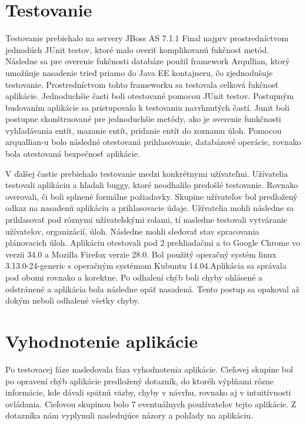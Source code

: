 	



 
\section{Testovanie}
Testovanie prebiehalo na servery JBoss AS 7.1.1 Final najprv prostredníctvom jednodúch JUnit testov, ktoré malo overiť komplikovanú fukčnosť metód. Následne sa pre overenie fukčnosti databáze použil framework Arqullian, ktorý umožňuje nasadenie tried priamo do Java EE kontajneru, čo zjednodušuje testovanie. Prostredníctvom tohto frameworku sa testovala celková fukčnosť aplikácie. Jednoduchšie časti boli otestované pomocou JUnit testov. Postupným budovaním aplikácie sa pristupovalo k testovaniu navrhnutých častí. Junit boli postupne skonštruované pre jednoduchšie metódy, ako je overenie funkčnosti vyhľadávania entít, mazanie entít, pridanie entít do zoznamu úloh. Pomocou arquallian-u bolo následné otestovaná prihlasovanie, databázové operácie, rovnako bola otestovaná bezpečnosť aplikácie.


V ďalšej častie prebiehalo testovanie medzi konkrétnymi užívateľmi. Užívatelia testovali aplikáciu a hľadali buggy, ktoré neodhalilo predošlé testovanie. Rovnako overovali, či boli splnené formálne požiadavky. Skupine užívateľov bol predložený odkaz na nasadenú aplikáciu a prihlasovacie údaje. Užívatelia mohli následne sa prihlasovať pod rôznymi užívateľskými rolami, tí nasledne testovali vytváranie užívatelov, organizácií, úloh. Následne mohli sledovať stav spracovania plánovacich úloh. Aplikáciu otestovali pod 2 prehliadačmi a to Google Chrome vo verzii 34.0 a Mozilla Firefox verzie 28.0. Bol použitý operačný systém linux 3.13.0-24-generic s operačným systémom Kubuntu 14.04.Aplikácia sa správala pod obomi rovnako a korektne. Po odhalení chýb boli chyby ohlásené a odstránené a aplikácia bola následne opäť nasadená. Tento postup sa opakoval až dokým neboli odhalené všetky chyby. 




\section{Vyhodnotenie aplikácie}
Po testovacej fáze nasledovala fáza vyhodnotenia aplikácie. Cieľovej skupine bol po opravení chýb aplikácie predložený dotazník, do ktoréh výplňami rôzne informácie, kde dávali spätnú väzby, chyby v návrhu, rovnako aj v intuitívnosti ovládania. Cieľovou skupinou bolo 7 eventuálnych používateľov tejto aplikácie. Z dotazníka nám vyplynuli nasledujúce názory a pohľady na aplikáciu.


















